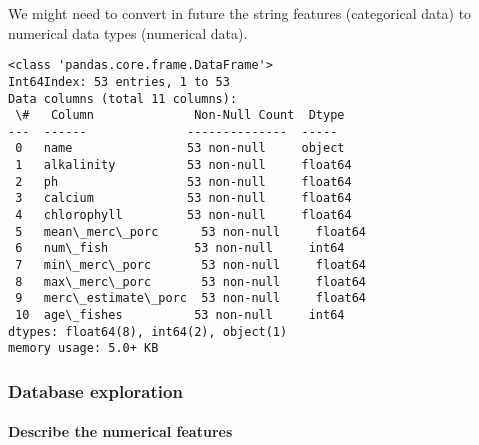 \documentclass[11pt]{article}
\begin{document}
We might need to convert in future the string features (categorical
data) to numerical data types (numerical data).

    \begin{Verbatim}[commandchars=\\\{\}]
<class 'pandas.core.frame.DataFrame'>
Int64Index: 53 entries, 1 to 53
Data columns (total 11 columns):
 \#   Column              Non-Null Count  Dtype
---  ------              --------------  -----
 0   name                53 non-null     object
 1   alkalinity          53 non-null     float64
 2   ph                  53 non-null     float64
 3   calcium             53 non-null     float64
 4   chlorophyll         53 non-null     float64
 5   mean\_merc\_porc      53 non-null     float64
 6   num\_fish            53 non-null     int64
 7   min\_merc\_porc       53 non-null     float64
 8   max\_merc\_porc       53 non-null     float64
 9   merc\_estimate\_porc  53 non-null     float64
 10  age\_fishes          53 non-null     int64
dtypes: float64(8), int64(2), object(1)
memory usage: 5.0+ KB
    \end{Verbatim}

    \hypertarget{database-exploration}{%
\subsubsection{Database exploration}\label{database-exploration}}

\hypertarget{describe-the-numerical-features}{%
\paragraph{Describe the numerical
features}\label{describe-the-numerical-features}}
\end{document}
